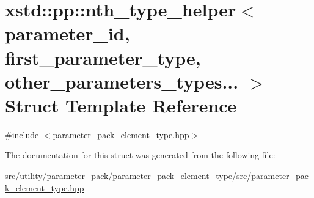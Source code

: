 \hypertarget{structxstd_1_1pp_1_1nth__type__helper_3_01parameter__id_00_01first__parameter__type_00_01other__parameters__types_8_8_8_01_4}{\section{xstd\-:\-:pp\-:\-:nth\-\_\-type\-\_\-helper$<$ parameter\-\_\-id, first\-\_\-parameter\-\_\-type, other\-\_\-parameters\-\_\-types... $>$ Struct Template Reference}
\label{structxstd_1_1pp_1_1nth__type__helper_3_01parameter__id_00_01first__parameter__type_00_01other__parameters__types_8_8_8_01_4}
}


{\ttfamily \#include $<$parameter\-\_\-pack\-\_\-element\-\_\-type.\-hpp$>$}



The documentation for this struct was generated from the following file\-:\begin{DoxyCompactItemize}
\item 
src/utility/parameter\-\_\-pack/parameter\-\_\-pack\-\_\-element\-\_\-type/src/\hyperlink{parameter__pack__element__type_8hpp}{parameter\-\_\-pack\-\_\-element\-\_\-type.\-hpp}\end{DoxyCompactItemize}
